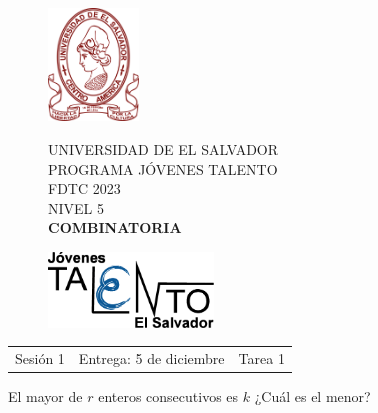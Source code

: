 \documentclass[letterpaper,12pt]{article}
\newcommand{\tema}{Sesión 1}
\newcommand{\fecha}{Entrega: 5 de diciembre}
\newcommand{\sesion}{Tarea 1}
\begin{document}
\thispagestyle{empty}

\begin{figure}[h] 
	\begin{minipage}[b]{0.26\textwidth}
		\begin{center}
			\includegraphics[height=3cm]{Logos/UES.png}
			\par\end{center}
	\end{minipage} 
	\begin{minipage}[b]{0.46\textwidth}
		\begin{center}
			UNIVERSIDAD DE EL SALVADOR\\ [0.1cm]
			PROGRAMA JÓVENES TALENTO\\ [0.1cm]
	        FDTC 2023\\ [0.1cm]
                NIVEL 5\\ [0.1cm]
			\textbf{COMBINATORIA} 
			\par\end{center}
	\end{minipage} 
	\begin{minipage}[b]{0.05\textwidth}
		\begin{center}
			\includegraphics[height=2cm]{Logos/LOGO PJT.png}
			\par\end{center}
	\end{minipage}
\end{figure}

\begin{center}
    \begin{tabular}{p{4.5cm} p{7cm} p{4.5cm}}
        \tema & \centering\fecha & \hfill\sesion
    \end{tabular}
\end{center}

\begin{problema}[3 puntos]
    El mayor de $r$ enteros consecutivos es $k$ ¿Cuál es el menor?
\end{problema}
\end{document}
